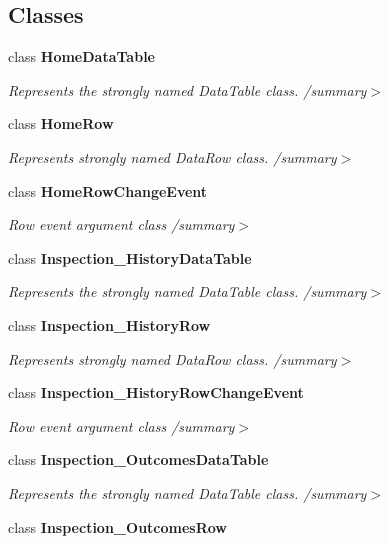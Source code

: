 \subsection*{Classes}
\begin{DoxyCompactItemize}
\item 
class \textbf{ Home\+Data\+Table}
\begin{DoxyCompactList}\small\item\em Represents the strongly named Data\+Table class. /summary$>$ \end{DoxyCompactList}\item 
class \textbf{ Home\+Row}
\begin{DoxyCompactList}\small\item\em Represents strongly named Data\+Row class. /summary$>$ \end{DoxyCompactList}\item 
class \textbf{ Home\+Row\+Change\+Event}
\begin{DoxyCompactList}\small\item\em Row event argument class /summary$>$ \end{DoxyCompactList}\item 
class \textbf{ Inspection\+\_\+\+History\+Data\+Table}
\begin{DoxyCompactList}\small\item\em Represents the strongly named Data\+Table class. /summary$>$ \end{DoxyCompactList}\item 
class \textbf{ Inspection\+\_\+\+History\+Row}
\begin{DoxyCompactList}\small\item\em Represents strongly named Data\+Row class. /summary$>$ \end{DoxyCompactList}\item 
class \textbf{ Inspection\+\_\+\+History\+Row\+Change\+Event}
\begin{DoxyCompactList}\small\item\em Row event argument class /summary$>$ \end{DoxyCompactList}\item 
class \textbf{ Inspection\+\_\+\+Outcomes\+Data\+Table}
\begin{DoxyCompactList}\small\item\em Represents the strongly named Data\+Table class. /summary$>$ \end{DoxyCompactList}\item 
class \textbf{ Inspection\+\_\+\+Outcomes\+Row}

\end{DoxyCompactItemize}
